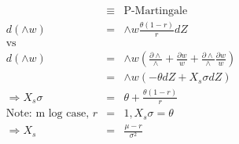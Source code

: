 \documentclass[]{article}
\begin{document}
\begin{eqnarray*}
&\equiv & \mbox{P-Martingale}\\
d(\wedge w) &=& \wedge w \frac{\theta \left( 1-r \right)}{r} dZ\\
\mbox{vs} && \\
d(\wedge w) &=& \wedge w \left( \frac{\partial \wedge}{\wedge} + \frac{\partial w}{w} + \frac{\partial \wedge}{\wedge} \frac{\partial w}{w}\right)\\
&=& \wedge w \left( -\theta dZ + X_s \sigma dZ \right)\\
\Rightarrow X_s \sigma &=& \theta + \frac{\theta \left( 1-r \right)}{r}\\
\mbox{Note: m log case, } r &=& 1, X_s \sigma = \theta\\
\Rightarrow X_s &=& \frac{\mu -r}{\sigma ^2}
\end{eqnarray*}
\end{document}
